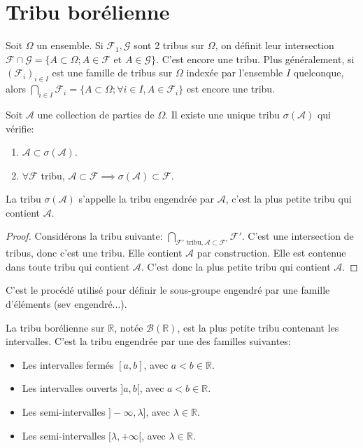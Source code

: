\section{Tribu borélienne}
Soit $\Omega$ un ensemble. Si $\mathcal{F}_1, \mathcal{G}$ sont 2 tribus sur $\Omega$, on définit leur intersection $\mathcal{F} \cap \mathcal{G} = \{A \subset \Omega; A \in \mathcal{F} \text{ et } A \in \mathcal{G}\}$. C'est encore une tribu.
Plus généralement, si $(\mathcal{F}_i)_{i \in I}$ est une famille de tribus sur $\Omega$ indexée par l'ensemble $I$ quelconque, alors $\bigcap_{i \in I} \mathcal{F}_i = \{A \subset \Omega; \forall i \in I, A \in \mathcal{F}_i\}$ est encore une tribu.
\begin{proposition}
Soit $\mathcal{A}$ une collection de parties de $\Omega$. Il existe une unique tribu $\sigma(\mathcal{A})$ qui vérifie:
\begin{enumerate}
    \item[i)] $\mathcal{A} \subset \sigma(\mathcal{A})$.
    \item[ii)] $\forall \mathcal{F}$ tribu, $\mathcal{A} \subset \mathcal{F} \implies \sigma(\mathcal{A}) \subset \mathcal{F}$.
\end{enumerate}
La tribu $\sigma(\mathcal{A})$ s'appelle la tribu engendrée par $\mathcal{A}$, c'est la plus petite tribu qui contient $\mathcal{A}$.
\end{proposition}
\begin{proof}
Considérons la tribu suivante: $\bigcap_{\mathcal{F}' \text{ tribu}, \mathcal{A} \subset \mathcal{F}'} \mathcal{F}'$. C'est une intersection de tribus, donc c'est une tribu. Elle contient $\mathcal{A}$ par construction. Elle est contenue dans toute tribu qui contient $\mathcal{A}$. C'est donc la plus petite tribu qui contient $\mathcal{A}$.
\end{proof}
\begin{remark}
C'est le procédé utilisé pour définir le sous-groupe engendré par une famille d'éléments (sev engendré...).
\end{remark}
\begin{definition}
La tribu borélienne sur $\mathbb{R}$, notée $\mathcal{B}(\mathbb{R})$, est la plus petite tribu contenant les intervalles. C'est la tribu engendrée par une des familles suivantes:
\begin{itemize}
    \item Les intervalles fermés $[a, b]$, avec $a < b \in \mathbb{R}$.
    \item Les intervalles ouverts $]a, b[$, avec $a < b \in \mathbb{R}$.
    \item Les semi-intervalles $]-\infty, \lambda]$, avec $\lambda \in \mathbb{R}$.
    \item Les semi-intervalles $[\lambda, +\infty[$, avec $\lambda \in \mathbb{R}$.
\end{itemize}
\end{definition}
